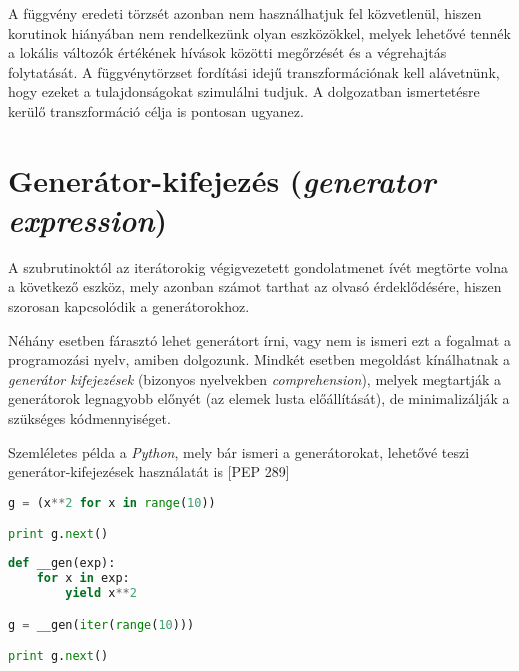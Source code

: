 A függvény eredeti törzsét azonban nem használhatjuk fel közvetlenül, hiszen korutinok hiányában nem rendelkezünk olyan eszközökkel, melyek lehetővé tennék a lokális változók értékének hívások közötti megőrzését és a végrehajtás folytatását. A függvénytörzset fordítási idejű transzformációnak kell alávetnünk, hogy ezeket a tulajdonságokat szimulálni tudjuk. A dolgozatban ismertetésre kerülő transzformáció célja is pontosan ugyanez.

\pagebreak

\section{Generátor-kifejezés (\textit{generator expression})}

A szubrutinoktól az iterátorokig végigvezetett gondolatmenet ívét megtörte volna a következő eszköz, mely azonban számot tarthat az olvasó érdeklődésére, hiszen szorosan kapcsolódik a generátorokhoz. 

Néhány esetben fárasztó lehet generátort írni, vagy nem is ismeri ezt a fogalmat a programozási nyelv, amiben dolgozunk. Mindkét esetben megoldást kínálhatnak a \textit{generátor kifejezések} (bizonyos nyelvekben \textit{comprehension}), melyek megtartják a generátorok legnagyobb előnyét (az elemek lusta előállítását), de minimalizálják a szükséges kódmennyiséget. 

Szemléletes példa a \textit{Python}, mely bár ismeri a generátorokat, lehetővé teszi generátor-kifejezések használatát is [PEP 289]

\begin{center}
\begin{minipage}[t]{0.45\textwidth}
\begin{lstlisting}[language=Python]
g = (x**2 for x in range(10))

print g.next()
\end{lstlisting}
\end{minipage} 
\begin{minipage}[t]{0.45\textwidth}
\begin{lstlisting}[language=Python,]
def __gen(exp):
    for x in exp:
        yield x**2

g = __gen(iter(range(10)))

print g.next()
\end{lstlisting} 
\end{minipage}
\label{PythonGenComparison}
\end{center}

